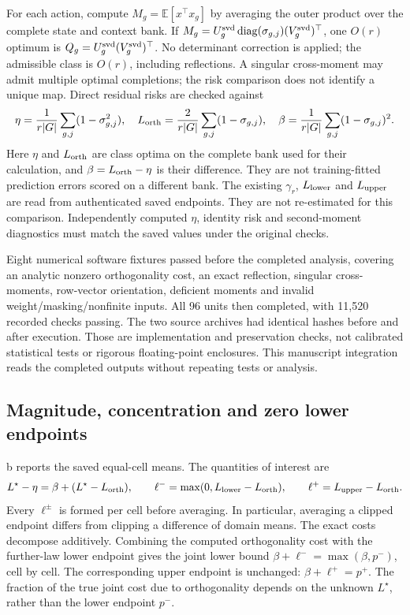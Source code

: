 For each action, compute $M_g=\mathbb E[x^\top x_g]$ by averaging the outer product over the complete state and context bank. If $M_g=U_g^{\rm svd}\operatorname{diag}(\sigma_{g,j})(V_g^{\rm svd})^\top$, one $O(r)$ optimum is $Q_g=U_g^{\rm svd}(V_g^{\rm svd})^\top$. No determinant correction is applied; the admissible class is $O(r)$, including reflections. A singular cross-moment may admit multiple optimal completions; the risk comparison does not identify a unique map. Direct residual risks are checked against
\[
 \eta=\frac{1}{r|G|}\sum_{g,j}(1-\sigma_{g,j}^2),\quad
 L_{\rm orth}=\frac{2}{r|G|}\sum_{g,j}(1-\sigma_{g,j}),\quad
 \beta=\frac{1}{r|G|}\sum_{g,j}(1-\sigma_{g,j})^2.
\]
Here $\eta$ and $L_{\rm orth}$ are class optima on the complete bank used for their calculation, and $\beta=L_{\rm orth}-\eta$ is their difference. They are not training-fitted prediction errors scored on a different bank. The existing $\gamma_r$, $L_{\rm lower}$ and $L_{\rm upper}$ are read from authenticated saved endpoints. They are not re-estimated for this comparison. Independently computed $\eta$, identity risk and second-moment diagnostics must match the saved values under the original checks.

Eight numerical software fixtures passed before the completed analysis, covering an analytic nonzero orthogonality cost, an exact reflection, singular cross-moments, row-vector orientation, deficient moments and invalid weight/masking/nonfinite inputs. All 96 units then completed, with 11,520 recorded checks passing. The two source archives had identical hashes before and after execution. Those are implementation and preservation checks, not calibrated statistical tests or rigorous floating-point enclosures. This manuscript integration reads the completed outputs without repeating tests or analysis.

\subsection{Magnitude, concentration and zero lower endpoints}
b reports the saved equal-cell means. The quantities of interest are
\[
 L^\star-\eta=\beta+(L^\star-L_{\rm orth}),\qquad
 \ell^-=\max(0,L_{\rm lower}-L_{\rm orth}),\qquad
 \ell^+=L_{\rm upper}-L_{\rm orth}.
\]
Every $\ell^\pm$ is formed per cell before averaging. In particular, averaging a clipped endpoint differs from clipping a difference of domain means. The exact costs decompose additively. Combining the computed orthogonality cost with the further-law lower endpoint gives the joint lower bound $\beta+\ell^-=\max(\beta,p^-)$, cell by cell. The corresponding upper endpoint is unchanged: $\beta+\ell^+=p^+$. The fraction of the true joint cost due to orthogonality depends on the unknown $L^\star$, rather than the lower endpoint $p^-$.

